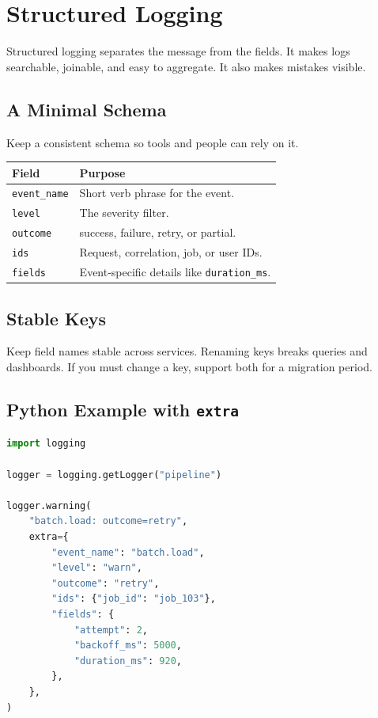 \chapter{Structured Logging}
Structured logging separates the message from the fields. It makes logs searchable, joinable, and easy to aggregate. It also makes mistakes visible.

\section{A Minimal Schema}
Keep a consistent schema so tools and people can rely on it.

\begin{table}[h]
\centering
\begin{tabularx}{\textwidth}{lX}
\toprule
Field & Purpose \\
\midrule
\texttt{event\_name} & Short verb phrase for the event. \\
\texttt{level} & The severity filter. \\
\texttt{outcome} & success, failure, retry, or partial. \\
\texttt{ids} & Request, correlation, job, or user IDs. \\
\texttt{fields} & Event-specific details like \texttt{duration\_ms}. \\
\bottomrule
\end{tabularx}
\end{table}

\section{Stable Keys}
Keep field names stable across services. Renaming keys breaks queries and dashboards. If you must change a key, support both for a migration period.

\section{Python Example with \texttt{extra}}
\begin{lstlisting}[language=Python]
import logging

logger = logging.getLogger("pipeline")

logger.warning(
    "batch.load: outcome=retry",
    extra={
        "event_name": "batch.load",
        "level": "warn",
        "outcome": "retry",
        "ids": {"job_id": "job_103"},
        "fields": {
            "attempt": 2,
            "backoff_ms": 5000,
            "duration_ms": 920,
        },
    },
)
\end{lstlisting}
